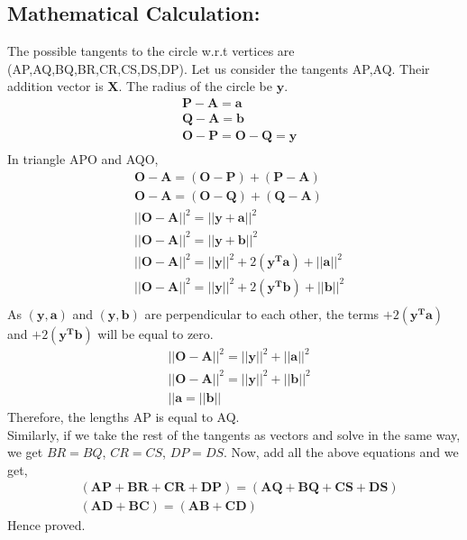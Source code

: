 \documentclass[a4paper,12pt,twocolumn]{article}
\let\vec\mathbf
\begin{document}
\subsection{Mathematical Calculation:}
The possible tangents to the circle w.r.t vertices are (AP,AQ,BQ,BR,CR,CS,DS,DP). Let us consider the tangents AP,AQ. Their addition vector is $\vec{X}$. The radius of the circle be $\vec{y}$.
\begin{align*}
&\vec{P-A} = \vec{a}\\
&\vec{Q-A} = \vec{b}\\
	&\vec{O-P} = \vec{O-Q} = \vec{y}\\
\end{align*}
In triangle APO and AQO,  
\begin{align*}
	&\vec{O-A}= \vec{(O-P)+(P-A)}\\
	&\vec{O-A}= \vec{(O-Q)+(Q-A)}\\
&||\vec{O-A}||^2 = ||\vec{y+a}||^2\\
	&||\vec{O-A}||^2 = ||\vec{y+b}||^2\\
	&||\vec{O-A}||^2 = ||\vec{y}||^2 +2(\vec{y^Ta}) +||\vec{a}||^2\\
&||\vec{O-A}||^2 = ||\vec{y}||^2 +2(\vec{y^Tb}) +||\vec{b}||^2\\
\end{align*}
As $\vec{(y,a)}$ and $\vec{(y,b)}$ are perpendicular to each other, the terms $+2(\vec{y^Ta})$ and $+2(\vec{y^Tb})$ will be equal to zero. 
\begin{align*}
&||\vec{O-A}||^2 = ||\vec{y}||^2 + ||\vec{a}||^2 \\
&||\vec{O-A}||^2 = ||\vec{y}||^2 + ||\vec{b}||^2\\
&||\vec{a} = ||\vec{b}||
\end{align*}
Therefore, the lengths AP is equal to AQ.\\
Similarly, if we take the rest of the tangents as vectors and solve in the same way, we get $BR = BQ$, $CR = CS$, $DP = DS$.
Now, add all the above equations and we get,
\begin{align*}
	&\vec{(AP+BR+CR+DP)} = \vec{(AQ+BQ+CS+DS)}\\
	&\vec{(AD+BC)} = \vec{(AB+CD)}
\end{align*}
Hence proved.
\end{document}
